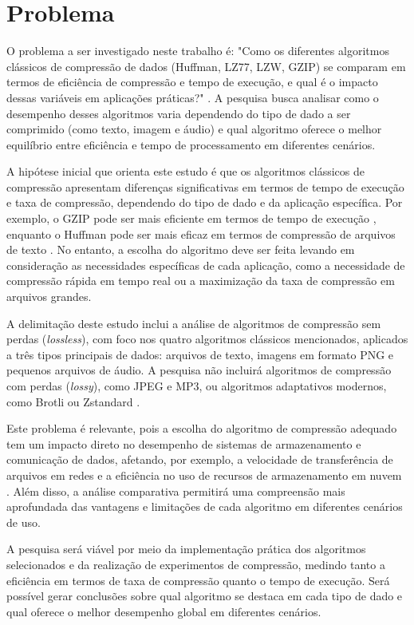 \chapter{Problema}
\label{c.problema}

O problema a ser investigado neste trabalho é: "Como os diferentes algoritmos clássicos de compressão de dados (Huffman, LZ77, LZW, GZIP) se comparam em termos de eficiência de compressão e tempo de execução, e qual é o impacto dessas variáveis em aplicações práticas?" \cite{salomon2007data}. A pesquisa busca analisar como o desempenho desses algoritmos varia dependendo do tipo de dado a ser comprimido (como texto, imagem e áudio) e qual algoritmo oferece o melhor equilíbrio entre eficiência e tempo de processamento em diferentes cenários.

A hipótese inicial que orienta este estudo é que os algoritmos clássicos de compressão apresentam diferenças significativas em termos de tempo de execução e taxa de compressão, dependendo do tipo de dado e da aplicação específica. Por exemplo, o GZIP pode ser mais eficiente em termos de tempo de execução \cite{deutsch1996gzip}, enquanto o Huffman pode ser mais eficaz em termos de compressão de arquivos de texto \cite{salomon2007data}. No entanto, a escolha do algoritmo deve ser feita levando em consideração as necessidades específicas de cada aplicação, como a necessidade de compressão rápida em tempo real ou a maximização da taxa de compressão em arquivos grandes.

A delimitação deste estudo inclui a análise de algoritmos de compressão sem perdas (\textit{lossless}), com foco nos quatro
algoritmos clássicos mencionados, aplicados a três tipos principais de dados: arquivos de texto, imagens em formato PNG
e pequenos arquivos de áudio. A pesquisa não incluirá algoritmos de compressão com perdas (\textit{lossy}), como JPEG e MP3, ou algoritmos adaptativos modernos, como Brotli \cite{alakuijala2016brotli} ou Zstandard \cite{collet2016zstandard}.

Este problema é relevante, pois a escolha do algoritmo de compressão adequado tem um impacto direto no desempenho de sistemas de armazenamento e comunicação de dados, afetando, por exemplo, a velocidade de transferência de arquivos em redes e a eficiência no uso de recursos de armazenamento em nuvem \cite{deutsch1996gzip}. Além disso, a análise comparativa permitirá uma compreensão mais aprofundada das vantagens e limitações de cada algoritmo em diferentes cenários de uso.

A pesquisa será viável por meio da implementação prática dos algoritmos selecionados e da realização de experimentos de compressão, medindo tanto a eficiência em termos de taxa de compressão quanto o tempo de execução. Será possível gerar conclusões sobre qual algoritmo se destaca em cada tipo de dado e qual oferece o melhor desempenho global em diferentes cenários.

